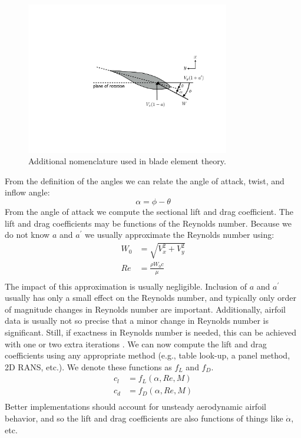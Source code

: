 \documentclass{article}
\begin{document}
\begin{figure}[htbp]
\centering
\includegraphics[width=3.5in]{figures/inflow2}
\caption{Additional nomenclature used in blade element theory.}
\label{fig:inflow2}
\end{figure}

From the definition of the angles we can relate the angle of attack, twist, and inflow angle:
\begin{equation}
    \alpha = \phi - \theta
    \label{eq:aoa}
\end{equation}
From the angle of attack we compute the sectional lift and drag coefficient.  The lift and drag coefficients may be functions of the Reynolds number.  Because we do not know $a$ and $a^\prime$ we usually approximate the Reynolds number using:
\begin{equation}
    \begin{aligned}
        W_0 &= \sqrt{V_x^2 + V_y^2}\\
        Re &= \frac{\rho W_0 c}{\mu}\\
    \end{aligned}
\end{equation}
The impact of this approximation is usually negligible.  Inclusion of $a$ and $a^\prime$ usually has only a small effect on the Reynolds number, and typically only order of magnitude changes in Reynolds number are important.  Additionally, airfoil data is usually not so precise that a minor change in Reynolds number is significant.  Still, if exactness in Reynolds number is needed, this can be achieved with one or two extra iterations \cite{Ning2014b}.  We can now compute the lift and drag coefficients using any appropriate method (e.g., table look-up, a panel method, 2D RANS, etc.).  We denote these functions as $f_L$ and $f_D$.
\begin{equation}
    \begin{aligned}
        c_l &= f_L(\alpha, Re, M)\\
        c_d &= f_D(\alpha, Re, M)\\
    \end{aligned}
\end{equation}
Better implementations should account for unsteady aerodynamic airfoil behavior, and so the lift and drag coefficients are also functions of things like $\dot{\alpha}$, etc.
\end{document}
